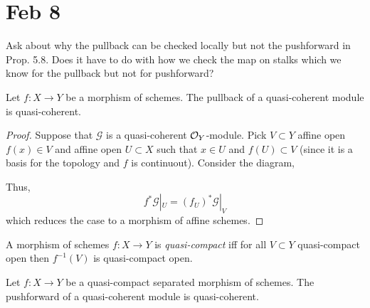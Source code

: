 \documentclass[12pt]{article}
\begin{document}
\section{Feb 8}

Ask about why the pullback can be checked locally but not the pushforward in Prop. 5.8. Does it have to do with how we check the map on stalks which we know for the pullback but not for pushforward?

\begin{lemma}
Let $f : X \to Y$ be a morphism of schemes. The pullback of a quasi-coherent module is quasi-coherent.
\end{lemma}

\begin{proof} 
Suppose that $\mathcal{G}$ is a quasi-coherent $\mathcal{O}_{Y}$-module. Pick $V \subset Y$ affine open $f(x) \in V$ and affine open $U \subset X$ such that $x \in U$ and $f(U) \subset V$ (since it is a basis for the topology and $f$ is continuout). Consider the diagram,
\begin{center}
\end{center} 
Thus,
\[ f^* \mathcal{G}|_U = (f_U)^* \mathcal{G}|_V \]
which reduces the case to a morphism of affine schemes. 
\end{proof}

\begin{definition}
A morphism of schemes $f : X \to Y$ is \textit{quasi-compact} iff for all $V \subset Y$ quasi-compact open then $f^{-1}(V)$ is quasi-compact open. 
\end{definition}

\begin{lemma}
Let $f : X \to Y$ be a quasi-compact separated morphism of schemes. The pushforward of a quasi-coherent module is quasi-coherent.
\end{lemma}
\end{document}
